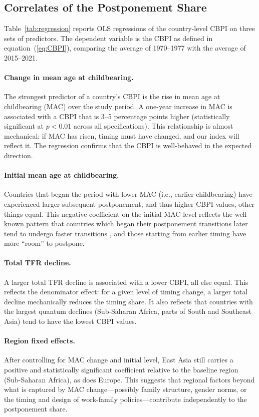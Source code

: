 \documentclass[12pt]{article}
\begin{document}
\subsection{Correlates of the Postponement Share}
\label{sec:correlates}

Table~\ref{tab:regression} reports OLS regressions of the country-level
CBPI on three sets of predictors.  The dependent variable is the
CBPI as defined in equation~(\ref{eq:CBPI}), comparing the average of
1970--1977 with the average of 2015--2021.

\paragraph{Change in mean age at childbearing.}
The strongest predictor of a country's CBPI is the rise in mean age at
childbearing (MAC) over the study period.  A one-year increase in MAC
is associated with a CBPI that is 3--5 percentage points higher
(statistically significant at $p < 0.01$ across all specifications).
This relationship is almost mechanical: if MAC has risen, timing must
have changed, and our index will reflect it.  The regression confirms
that the CBPI is well-behaved in the expected direction.

\paragraph{Initial mean age at childbearing.}
Countries that began the period with lower MAC (i.e., earlier
childbearing) have experienced larger subsequent postponement, and thus
higher CBPI values, other things equal.  This negative coefficient on
the initial MAC level reflects the well-known pattern that countries
which began their postponement transitions later tend to undergo faster
transitions \citep{Kohler2002}, and those starting from earlier timing
have more ``room'' to postpone.

\paragraph{Total TFR decline.}
A larger total TFR decline is associated with a lower CBPI, all else
equal.  This reflects the denominator effect: for a given level of
timing change, a larger total decline mechanically reduces the timing
share.  It also reflects that countries with the largest quantum declines
(Sub-Saharan Africa, parts of South and Southeast Asia) tend to have
the lowest CBPI values.

\paragraph{Region fixed effects.}
After controlling for MAC change and initial level, East Asia still
carries a positive and statistically significant coefficient relative
to the baseline region (Sub-Saharan Africa), as does Europe.
This suggests that regional factors beyond what is captured by MAC
change---possibly family structure, gender norms, or the timing and
design of work-family policies---contribute independently to the
postponement share.
\end{document}
